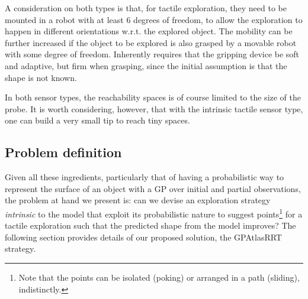A consideration on both types is that, for tactile exploration, they need to be mounted in a robot with at least $6$ degrees of freedom, to allow the exploration to happen in different orientations w.r.t. the explored object. The mobility can be further increased if the object to be explored is also grasped by a movable robot with some degree of freedom. Inherently requires that the gripping device be soft and adaptive, but firm when grasping, since the initial assumption is that the shape is not known.

In both sensor types, the reachability spaces is of course limited to the size of the probe. It is worth considering, however, that with the intrinsic tactile sensor type, one can build a very small tip to reach tiny spaces.


\subsection{Problem definition}
\label{sec:problem_definition}

Given all these ingredients, particularly that of having a probabilistic way to represent the surface of an object with a GP over initial and partial observations, the problem at hand we present is: can we devise an exploration strategy \emph{intrinsic} to the model that exploit its probabilistic nature to suggest points\footnote{Note that the points can be isolated (poking) or arranged in a path (sliding), indistinctly.} for a tactile exploration such that the predicted shape from the model improves? The following section provides details of our proposed solution, the GPAtlasRRT strategy.
